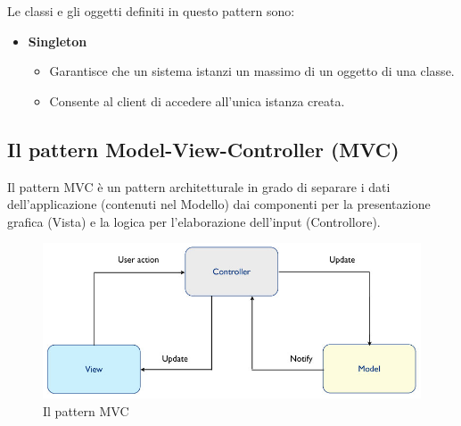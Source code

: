 \documentclass[12pt]{article}
\begin{document}
Le classi e gli oggetti definiti in questo pattern sono:
\begin{itemize}
	\item \textbf{Singleton}
	\begin{itemize}
		\item Garantisce che un sistema istanzi un massimo di un oggetto di una classe.
		\item Consente al client di accedere all'unica istanza creata.
	\end{itemize}
\end{itemize}

\subsection{Il pattern Model-View-Controller (MVC)}
Il pattern MVC è un pattern architetturale in grado di separare i dati dell'applicazione (contenuti nel Modello) dai componenti per la presentazione grafica (Vista) e la
logica per l'elaborazione dell'input (Controllore).

\begin{figure}[H]
	\centering
	\includegraphics[scale=0.40]{images/mvc.jpg}
	\caption{Il pattern MVC}
	\label{mvc}
\end{figure}
\end{document}
